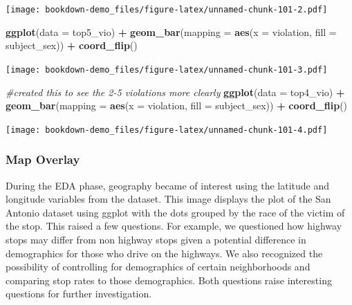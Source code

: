 \documentclass[
]{book}
\newenvironment{Shaded}{\begin{snugshade}}{\end{snugshade}}
\newcommand{\CommentTok}[1]{\textcolor[rgb]{0.56,0.35,0.01}{\textit{#1}}}
\newcommand{\DataTypeTok}[1]{\textcolor[rgb]{0.13,0.29,0.53}{#1}}
\newcommand{\KeywordTok}[1]{\textcolor[rgb]{0.13,0.29,0.53}{\textbf{#1}}}
\newcommand{\NormalTok}[1]{#1}
\newcommand{\OperatorTok}[1]{\textcolor[rgb]{0.81,0.36,0.00}{\textbf{#1}}}
\newcommand{\StringTok}[1]{\textcolor[rgb]{0.31,0.60,0.02}{#1}}
\begin{document}
\texttt{[image: bookdown-demo\_files/figure-latex/unnamed-chunk-101-2.pdf]}

\begin{Shaded}
\begin{Highlighting}[]
\KeywordTok{ggplot}\NormalTok{(}\DataTypeTok{data =}\NormalTok{ top5_vio) }\OperatorTok{+}\StringTok{ }\KeywordTok{geom_bar}\NormalTok{(}\DataTypeTok{mapping =} \KeywordTok{aes}\NormalTok{(}\DataTypeTok{x =}\NormalTok{ violation, }\DataTypeTok{fill =}\NormalTok{ subject_sex)) }\OperatorTok{+}\StringTok{ }
\StringTok{  }\KeywordTok{coord_flip}\NormalTok{()}
\end{Highlighting}
\end{Shaded}

\texttt{[image: bookdown-demo\_files/figure-latex/unnamed-chunk-101-3.pdf]}

\begin{Shaded}
\begin{Highlighting}[]
\CommentTok{#created this to see the 2-5 violations more clearly}
\KeywordTok{ggplot}\NormalTok{(}\DataTypeTok{data =}\NormalTok{ top4_vio) }\OperatorTok{+}\StringTok{ }\KeywordTok{geom_bar}\NormalTok{(}\DataTypeTok{mapping =} \KeywordTok{aes}\NormalTok{(}\DataTypeTok{x =}\NormalTok{ violation, }\DataTypeTok{fill =}\NormalTok{ subject_sex)) }\OperatorTok{+}\StringTok{ }
\StringTok{  }\KeywordTok{coord_flip}\NormalTok{()}
\end{Highlighting}
\end{Shaded}

\texttt{[image: bookdown-demo\_files/figure-latex/unnamed-chunk-101-4.pdf]}

\hypertarget{map-overlay}{%
\subsubsection{Map Overlay}\label{map-overlay}}

During the EDA phase, geography became of interest using the latitude and longitude variables from the dataset. This image displays the plot of the San Antonio dataset using ggplot with the dots grouped by the race of the victim of the stop. This raised a few questions. For example, we questioned how highway stops may differ from non highway stops given a potential difference in demographics for those who drive on the highways. We also recognized the possibility of controlling for demographics of certain neighborhoods and comparing stop rates to those demographics. Both questions raise interesting questions for further investigation.
\end{document}
